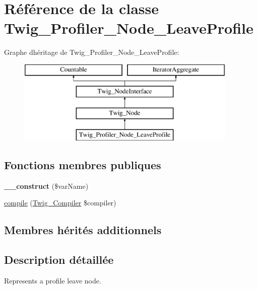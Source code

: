 \hypertarget{class_twig___profiler___node___leave_profile}{}\section{Référence de la classe Twig\+\_\+\+Profiler\+\_\+\+Node\+\_\+\+Leave\+Profile}
\label{class_twig___profiler___node___leave_profile}
Graphe d\textquotesingle{}héritage de Twig\+\_\+\+Profiler\+\_\+\+Node\+\_\+\+Leave\+Profile\+:\begin{figure}[H]
\begin{center}
\leavevmode
\includegraphics[height=4.000000cm]{class_twig___profiler___node___leave_profile}
\end{center}
\end{figure}
\subsection*{Fonctions membres publiques}
\begin{DoxyCompactItemize}
\item 
{\bfseries \+\_\+\+\_\+construct} (\$var\+Name)\hypertarget{class_twig___profiler___node___leave_profile_a388446705ebca778a4889b65a6c8ceb3}{}\label{class_twig___profiler___node___leave_profile_a388446705ebca778a4889b65a6c8ceb3}

\item 
\hyperlink{class_twig___profiler___node___leave_profile_a4e0faa87c3fae583620b84d3607085da}{compile} (\hyperlink{class_twig___compiler}{Twig\+\_\+\+Compiler} \$compiler)
\end{DoxyCompactItemize}
\subsection*{Membres hérités additionnels}


\subsection{Description détaillée}
Represents a profile leave node.

